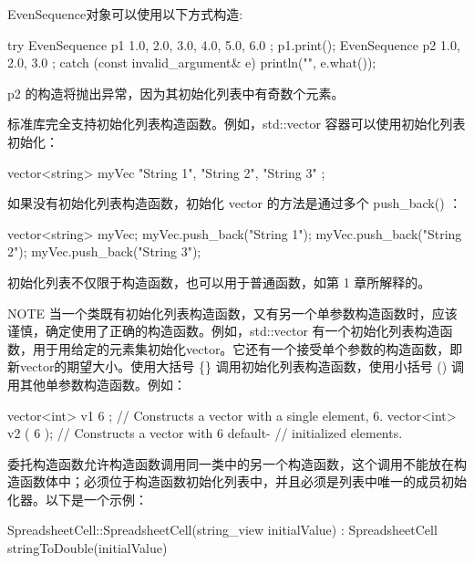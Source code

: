 EvenSequence对象可以使用以下方式构造:

\begin{cpp}
try {
    EvenSequence p1 { 1.0, 2.0, 3.0, 4.0, 5.0, 6.0 };
    p1.print();
    EvenSequence p2 { 1.0, 2.0, 3.0 };
} catch (const invalid_argument& e) {
    println("{}", e.what());
}
\end{cpp}

p2 的构造将抛出异常，因为其初始化列表中有奇数个元素。

标准库完全支持初始化列表构造函数。例如，std::vector 容器可以使用初始化列表初始化：

\begin{cpp}
vector<string> myVec { "String 1", "String 2", "String 3" };
\end{cpp}

如果没有初始化列表构造函数，初始化 vector 的方法是通过多个 push\_back() ：

\begin{cpp}
vector<string> myVec;
myVec.push_back("String 1");
myVec.push_back("String 2");
myVec.push_back("String 3");
\end{cpp}

初始化列表不仅限于构造函数，也可以用于普通函数，如第 1 章所解释的。

\begin{myNotic}{NOTE}
当一个类既有初始化列表构造函数，又有另一个单参数构造函数时，应该谨慎，确定使用了正确的构造函数。例如，std::vector 有一个初始化列表构造函数，用于用给定的元素集初始化vector。它还有一个接受单个参数的构造函数，即新vector的期望大小。使用大括号 \{\} 调用初始化列表构造函数，使用小括号 () 调用其他单参数构造函数。例如：

\begin{cpp}
vector<int> v1 { 6 }; // Constructs a vector with a single element, 6.
vector<int> v2 ( 6 ); // Constructs a vector with 6 default-
                      // initialized elements.
\end{cpp}
\end{myNotic}


委托构造函数允许构造函数调用同一类中的另一个构造函数，这个调用不能放在构造函数体中；必须位于构造函数初始化列表中，并且必须是列表中唯一的成员初始化器。以下是一个示例：

\begin{cpp}
SpreadsheetCell::SpreadsheetCell(string_view initialValue)
: SpreadsheetCell { stringToDouble(initialValue) }
{}
\end{cpp}

